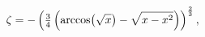 \[\zeta=-\left(\tfrac{3}{4}\left(\mathop{\mathrm{arccos}\/}\nolimits\!\left(%
\sqrt{x}\right)-\sqrt{x-x^{2}}\right)\right)^{\frac{2}{3}},\]